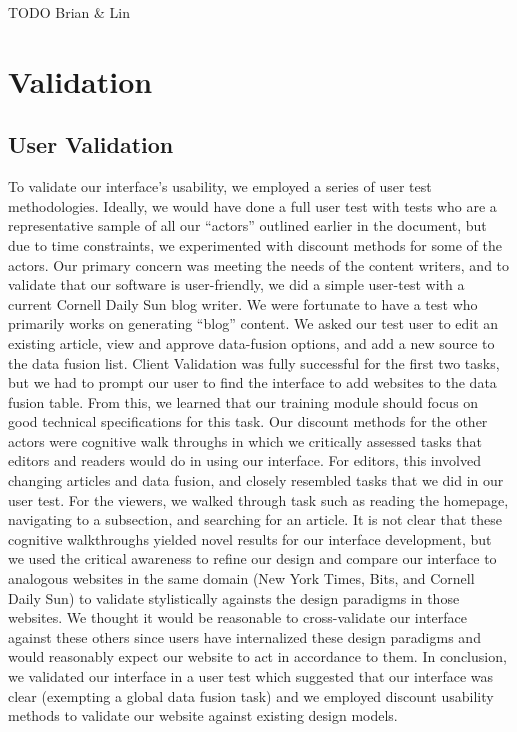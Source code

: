 \documentclass[11pt]{article} %
\begin{document}
TODO Brian \& Lin

\section{Validation}

\subsection{User Validation}

To validate our interface’s usability, we employed a series of user test methodologies. Ideally, we would have done a full user test with tests who are a representative sample of all our “actors” outlined earlier in the document, but due to time constraints, we experimented with discount methods for some of the actors. Our primary concern was meeting the needs of the content writers, and to validate that our software is user-friendly, we did a simple user-test with a current Cornell Daily Sun blog writer. We were fortunate to have a test who primarily works on generating “blog” content. We asked our test user to edit an existing article, view and approve data-fusion options, and add a new source to the data fusion list. Client Validation was fully successful for the first two tasks, but we had to prompt our user to find the interface to add websites to the data fusion table. From this, we learned that our training module should focus on good technical specifications for this task. Our discount methods for the other actors were cognitive walk throughs in which we critically assessed tasks that editors and readers would do in using our interface. For editors, this involved changing articles and data fusion, and closely resembled tasks that we did in our user test. For the viewers, we walked through task such as reading the homepage, navigating to a subsection, and searching for an article. It is not clear that these cognitive walkthroughs yielded novel results for our interface development, but we used the critical awareness to refine our design and compare our interface to analogous websites in the same domain (New York Times, Bits, and Cornell Daily Sun) to validate stylistically againsts the design paradigms in those websites. We thought it would be reasonable to cross-validate our interface against these others since users have internalized these design paradigms and would reasonably expect our website to act in accordance to them. In conclusion, we validated our interface in a user test which suggested that our interface was clear (exempting a global data fusion task) and we employed discount usability methods to validate our website against existing design models.
\end{document}
